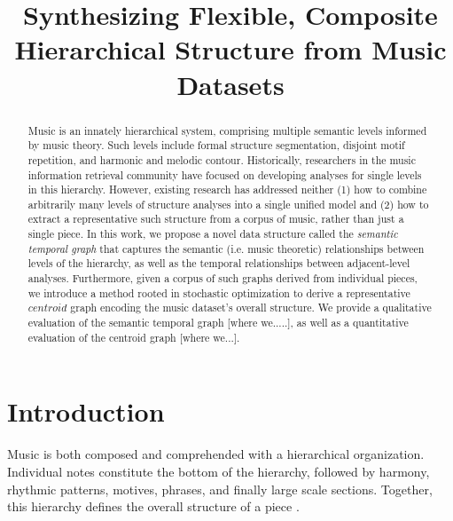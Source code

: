\documentclass{article}
\title{Synthesizing Flexible, Composite Hierarchical Structure from Music Datasets}
\begin{document}
%
\maketitle
%


\begin{abstract}
Music is an innately hierarchical system, comprising multiple semantic levels informed by music theory. Such levels include formal structure segmentation, disjoint motif repetition, and harmonic and melodic contour. Historically, researchers in the music information retrieval community have focused on developing analyses for single levels in this hierarchy. However, existing research has addressed neither (1) how to combine arbitrarily many levels of structure analyses into a single unified model and (2) how to extract a representative such structure from a corpus of music, rather than just a single piece. In this work, we propose a novel data structure called the \textit{semantic temporal graph} that captures the semantic (i.e. music theoretic) relationships between levels of the hierarchy, as well as the temporal relationships between adjacent-level analyses. Furthermore, given a corpus of such graphs derived from individual pieces, we introduce a method rooted in stochastic optimization to derive a representative $centroid$ graph encoding the music dataset's overall structure. We provide a qualitative evaluation of the semantic temporal graph [where we.....], as well as a quantitative evaluation of the centroid graph [where we...].
\end{abstract}


%
\section{Introduction}\label{sec:intro}
Music is both composed and comprehended with a hierarchical organization. Individual notes constitute the bottom of the hierarchy, followed by harmony, rhythmic patterns, motives, phrases, and finally large scale sections. Together, this hierarchy defines the overall structure of a piece \cite{msaf}.
\end{document}

